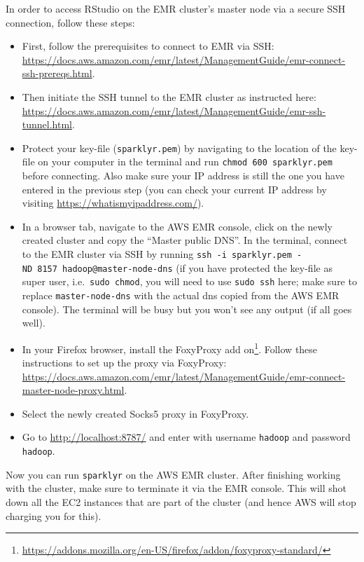 \documentclass[
  12pt,
]{style/krantz}
\renewcommand{\href}[2]{#2\footnote{\url{#1}}}
\begin{document}
In order to access RStudio on the EMR cluster's master node via a secure SSH connection, follow these steps:

\begin{itemize}
\item
  First, follow the prerequisites to connect to EMR via SSH: \url{https://docs.aws.amazon.com/emr/latest/ManagementGuide/emr-connect-ssh-prereqs.html}.
\item
  Then initiate the SSH tunnel to the EMR cluster as instructed here: \url{https://docs.aws.amazon.com/emr/latest/ManagementGuide/emr-ssh-tunnel.html}.
\item
  Protect your key-file (\texttt{sparklyr.pem}) by navigating to the location of the key-file on your computer in the terminal and run \texttt{chmod\ 600\ sparklyr.pem} before connecting. Also make sure your IP address is still the one you have entered in the previous step (you can check your current IP address by visiting \url{https://whatismyipaddress.com/}).
\item
  In a browser tab, navigate to the AWS EMR console, click on the newly created cluster and copy the ``Master public DNS''. In the terminal, connect to the EMR cluster via SSH by running \texttt{ssh\ -i\ sparklyr.pem\ -ND\ 8157\ hadoop@master-node-dns} (if you have protected the key-file as super user, i.e.~\texttt{sudo\ chmod}, you will need to use \texttt{sudo\ ssh} here; make sure to replace \texttt{master-node-dns} with the actual dns copied from the AWS EMR console). The terminal will be busy but you won't see any output (if all goes well).
\item
  In your Firefox browser, install the \href{https://addons.mozilla.org/en-US/firefox/addon/foxyproxy-standard/}{FoxyProxy add on}. Follow these instructions to set up the proxy via FoxyProxy: \url{https://docs.aws.amazon.com/emr/latest/ManagementGuide/emr-connect-master-node-proxy.html}.
\item
  Select the newly created Socks5 proxy in FoxyProxy.
\item
  Go to \url{http://localhost:8787/} and enter with username \texttt{hadoop} and password \texttt{hadoop}.
\end{itemize}

Now you can run \texttt{sparklyr} on the AWS EMR cluster. After finishing working with the cluster, make sure to terminate it via the EMR console. This will shot down all the EC2 instances that are part of the cluster (and hence AWS will stop charging you for this).
\end{document}
